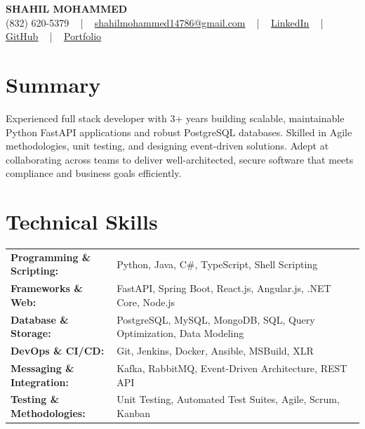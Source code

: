 \documentclass[letterpaper,11pt]{article}
\begin{document}
\begin{center}
    {\fontsize{14pt}{12pt}\selectfont \textbf{\MakeUppercase{Shahil Mohammed}}}\\ \vspace{2pt}
    \fontsize{10pt}{12pt}\selectfont (832) 620-5379 ~ | ~ \href{mailto:shahilmohammed14786@gmail.com}{shahilmohammed14786@gmail.com} ~ | ~  
    \href{https://www.linkedin.com/in/shahil-mohammed-9652931a1/}{\color{blue}\underline{LinkedIn}}  ~ | ~ 
    \href{https://github.com/freakbeast14}{\color{blue}\underline{GitHub}} ~ | ~ 
    \href{https://shahil-mohammed.netlify.app/}{\color{blue}\underline{Portfolio}}
    \vspace{-8pt}
\end{center}

\section{Summary}
\fontsize{9pt}{10pt}\selectfont
Experienced full stack developer with 3+ years building scalable, maintainable Python FastAPI applications and robust PostgreSQL databases. Skilled in Agile methodologies, unit testing, and designing event-driven solutions. Adept at collaborating across teams to deliver well-architected, secure software that meets compliance and business goals efficiently.
 \vspace{-5pt}
 
\section{Technical Skills}
        \vspace{-14pt}
        \begin{table}[h]
            \fontsize{9pt}{10pt}\selectfont
            \begin{tabular}{p{0.3\linewidth} p{0.7\linewidth}}
                \textbf{Programming \& Scripting:} & Python, Java, C\#, TypeScript, Shell Scripting \\
                \textbf{Frameworks \& Web:} & FastAPI, Spring Boot, React.js, Angular.js, .NET Core, Node.js \\
                \textbf{Database \& Storage:} & PostgreSQL, MySQL, MongoDB, SQL, Query Optimization, Data Modeling \\
                \textbf{DevOps \& CI/CD:} & Git, Jenkins, Docker, Ansible, MSBuild, XLR \\
                \textbf{Messaging \& Integration:} & Kafka, RabbitMQ, Event-Driven Architecture, REST API \\
                \textbf{Testing \& Methodologies:} & Unit Testing, Automated Test Suites, Agile, Scrum, Kanban \\
            \end{tabular}
        \end{table}
 \vspace{-15pt}
 
\end{document}
